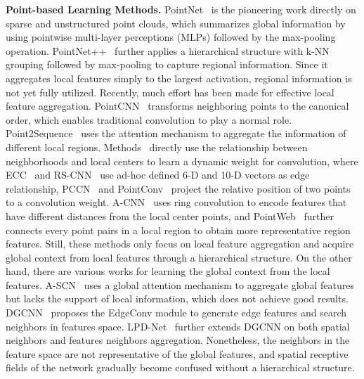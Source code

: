 \documentclass[10pt,twocolumn,letterpaper]{article}
\begin{document}
	{\noindent\bf Point-based Learning Methods.}
	PointNet~\cite{pointnet} is the pioneering work directly on sparse and unstructured point clouds, which summarizes global information by using pointwise multi-layer perceptions (MLPs) followed by the max-pooling operation.  PointNet++~\cite{pointnet2} further applies a hierarchical structure with k-NN grouping followed by max-pooling to capture regional information. Since it aggregates local features simply to the largest activation, regional information is not yet fully utilized. Recently, much effort has been made for effective local feature aggregation. PointCNN~\cite{PointCNN} transforms neighboring points to the canonical order, which enables traditional convolution to play a normal role. Point2Sequence~\cite{Point2Sequence} uses the attention mechanism to aggregate the information of different local regions. Methods~\cite{Spidercnn,PointConv, Monte,rscnn,ecc, PCCN} directly use the relationship between neighborhoods and local centers to learn a dynamic weight for convolution, where ECC~\cite{ecc} and RS-CNN~\cite{rscnn} use ad-hoc defined 6-D and 10-D vectors as edge relationship, PCCN~\cite{PCCN} and PointConv~\cite{PointConv} project the relative position of two points to a convolution weight. A-CNN~\cite{acnn} uses ring convolution to encode features that have different distances from the local center points, and PointWeb~\cite{PointWeb} further connects every point pairs in a local region to obtain more representative region features. Still, these methods only focus on local feature aggregation and acquire global context from local features through a hierarchical structure. On the other hand, there are various works for learning the global context from the local features. A-SCN~\cite{ASCN} uses a global attention mechanism to aggregate global features but lacks the support of local information, which does not achieve good results. DGCNN~\cite{DGCNN} proposes the EdgeConv module to generate edge features and search neighbors in features space. LPD-Net~\cite{liu2019lpd} further extends DGCNN on both spatial neighbors and features neighbors aggregation. Nonetheless, the neighbors in the feature space are not representative of the global features, and spatial receptive fields of the network gradually become confused without a hierarchical structure.
	
\end{document}
